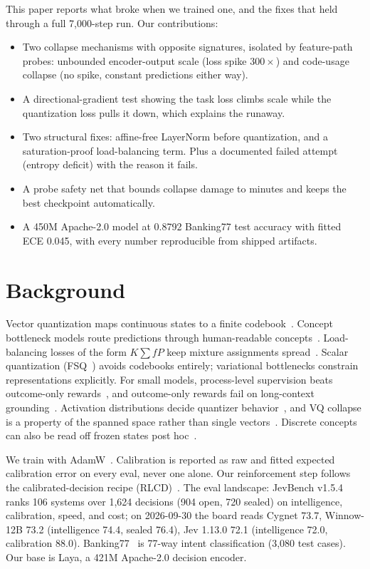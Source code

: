 \documentclass[11pt]{article}
\begin{document}
This paper reports what broke when we trained one, and the fixes that
held through a full 7,000-step run. Our contributions:

\begin{itemize}
\item Two collapse mechanisms with opposite signatures, isolated by
feature-path probes: unbounded encoder-output scale (loss spike $300\times$)
and code-usage collapse (no spike, constant predictions either way).
\item A directional-gradient test showing the task loss climbs scale while
the quantization loss pulls it down, which explains the runaway.
\item Two structural fixes: affine-free LayerNorm before quantization, and
a saturation-proof load-balancing term. Plus a documented failed attempt
(entropy deficit) with the reason it fails.
\item A probe safety net that bounds collapse damage to minutes and keeps
the best checkpoint automatically.
\item A 450M Apache-2.0 model at 0.8792 Banking77 test accuracy with fitted
ECE 0.045, with every number reproducible from shipped artifacts.
\end{itemize}

\section{Background}

Vector quantization maps continuous states to a finite codebook~\cite{vqvq}.
Concept bottleneck models route predictions through human-readable
concepts~\cite{koh2020}. Load-balancing losses of the form $K\sum fP$
keep mixture assignments spread~\cite{switch2101}. Scalar quantization
(FSQ~\cite{fsq2309}) avoids codebooks entirely; variational bottlenecks
constrain representations explicitly. For small models, process-level
supervision beats outcome-only rewards~\cite{rlvr2607}, and outcome-only
rewards fail on long-context grounding~\cite{longrlvr2603}. Activation
distributions decide quantizer behavior~\cite{infoquant2605}, and VQ
collapse is a property of the spanned space rather than single
vectors~\cite{collapse2411}. Discrete concepts can also be read off frozen
states post hoc~\cite{vqlc2602}.

We train with AdamW~\cite{adamw1711}. Calibration is reported as raw and
fitted expected calibration error on every eval, never one alone. Our
reinforcement step follows the calibrated-decision recipe (RLCD)~\cite{typesafe}. The eval
landscape: JevBench v1.5.4 ranks 106 systems over 1,624 decisions (904
open, 720 sealed) on intelligence, calibration, speed, and cost; on
2026-09-30 the board reads Cygnet 73.7, Winnow-12B 73.2 (intelligence
74.4, sealed 76.4), Jev 1.13.0 72.1 (intelligence 72.0, calibration 88.0).
Banking77~\cite{banking77} is 77-way intent classification (3,080 test
cases). Our base is Laya, a 421M Apache-2.0 decision encoder.
\end{document}
